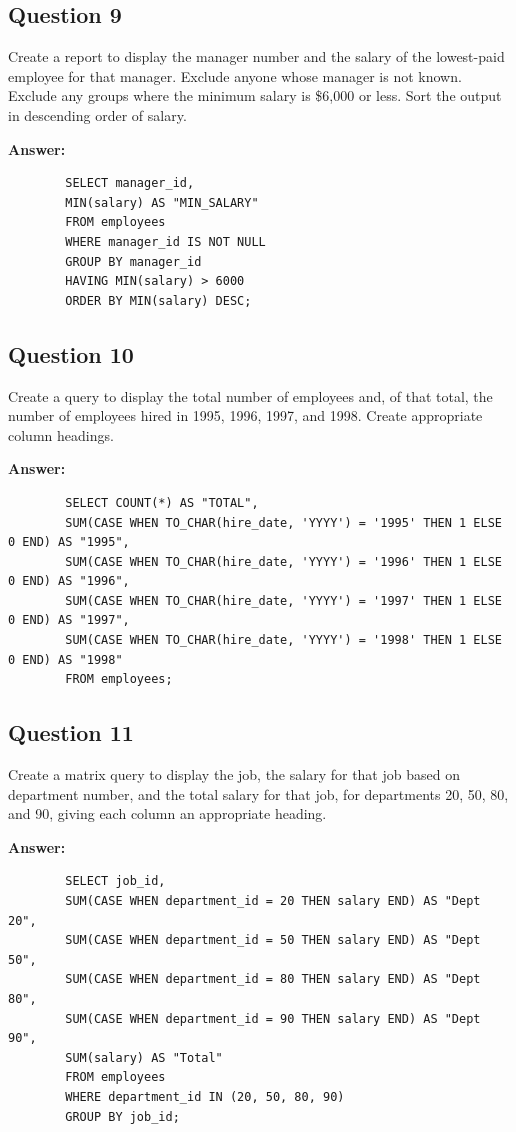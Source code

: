 \documentclass[12pt,a4paper]{article}
\begin{document}
\subsection*{Question 9}
Create a report to display the manager number and the salary of the lowest-paid employee for 
that manager. Exclude anyone whose manager is not known. Exclude any groups where the 
minimum salary is \$6,000 or less. Sort the output in descending order of salary.

\textbf{Answer:}
    \begin{lstlisting}
        SELECT manager_id,
        MIN(salary) AS "MIN_SALARY"
        FROM employees
        WHERE manager_id IS NOT NULL
        GROUP BY manager_id
        HAVING MIN(salary) > 6000
        ORDER BY MIN(salary) DESC;
    \end{lstlisting}
    
\subsection*{Question 10}
Create a query to display the total number of employees and, of that total, the number of 
employees hired in 1995, 1996, 1997, and 1998. Create appropriate column headings.

\textbf{Answer:}
    \begin{lstlisting}
        SELECT COUNT(*) AS "TOTAL",
        SUM(CASE WHEN TO_CHAR(hire_date, 'YYYY') = '1995' THEN 1 ELSE 0 END) AS "1995",
        SUM(CASE WHEN TO_CHAR(hire_date, 'YYYY') = '1996' THEN 1 ELSE 0 END) AS "1996",
        SUM(CASE WHEN TO_CHAR(hire_date, 'YYYY') = '1997' THEN 1 ELSE 0 END) AS "1997",
        SUM(CASE WHEN TO_CHAR(hire_date, 'YYYY') = '1998' THEN 1 ELSE 0 END) AS "1998"
        FROM employees;
    \end{lstlisting}
    
\subsection*{Question 11}
Create a matrix query to display the job, the salary for that job based on department number, 
and the total salary for that job, for departments 20, 50, 80, and 90, giving each column an 
appropriate heading.

\textbf{Answer:}
    \begin{lstlisting}
        SELECT job_id,
        SUM(CASE WHEN department_id = 20 THEN salary END) AS "Dept 20",
        SUM(CASE WHEN department_id = 50 THEN salary END) AS "Dept 50",
        SUM(CASE WHEN department_id = 80 THEN salary END) AS "Dept 80",
        SUM(CASE WHEN department_id = 90 THEN salary END) AS "Dept 90",
        SUM(salary) AS "Total"
        FROM employees
        WHERE department_id IN (20, 50, 80, 90)
        GROUP BY job_id;
    \end{lstlisting}
    
\end{document}
